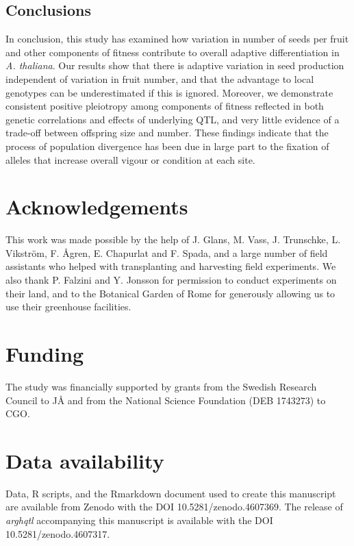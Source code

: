 \documentclass[]{article}
\begin{document}
\hypertarget{conclusions}{%
\subsection{Conclusions}\label{conclusions}}

In conclusion, this study has examined how variation in number of seeds per fruit and other components of fitness contribute to overall adaptive differentiation in \emph{A. thaliana}. Our results show that there is adaptive variation in seed production independent of variation in fruit number, and that the advantage to local genotypes can be underestimated if this is ignored. Moreover, we demonstrate consistent positive pleiotropy among components of fitness reflected in both genetic correlations and effects of underlying QTL, and very little evidence of a trade-off between offspring size and number. These findings indicate that the process of population divergence has been due in large part to the fixation of alleles that increase overall vigour or condition at each site.

\hypertarget{acknowledgements}{%
\section{Acknowledgements}\label{acknowledgements}}

This work was made possible by the help of J. Glans, M. Vass, J. Trunschke, L. Vikström, F. Ågren, E. Chapurlat and F. Spada, and a large number of field assistants who helped with transplanting and harvesting field experiments. We also thank P. Falzini and Y. Jonsson for permission to conduct experiments on their land, and to the Botanical Garden of Rome for generously allowing us to use their greenhouse facilities.

\hypertarget{funding}{%
\section{Funding}\label{funding}}

The study was financially supported by grants from the Swedish Research Council to JÅ and from the National Science Foundation (DEB 1743273) to CGO.

\hypertarget{data-availability}{%
\section{Data availability}\label{data-availability}}

Data, R scripts, and the Rmarkdown document used to create this manuscript are available from Zenodo with the DOI 10.5281/zenodo.4607369. The release of \emph{arghqtl} accompanying this manuscript is available with the DOI 10.5281/zenodo.4607317.
\end{document}
